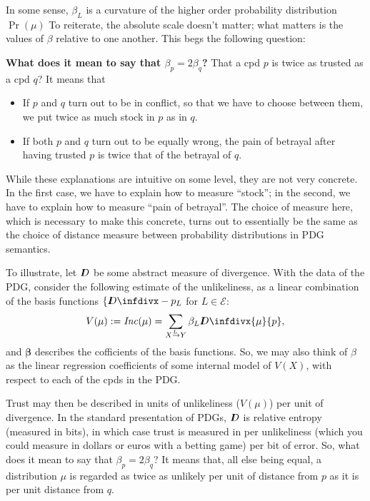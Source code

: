 \documentclass[twoside]{article} %
\theoremstyle{plain}
\theoremstyle{definition}
\newcommand{\thickD}{I\mkern-8muD}
\newcommand{\kldiv}{\thickD\infdivx}
\newcommand{\Ed}{\mathcal E}
\newcommand{\bbeta}{\boldsymbol\beta}
\newcommand\Inc{\mathit{Inc}}
\newcommand{\ed}[3]{#2%
    	  \overset{\smash{\mskip-5mu\raisebox{-1pt}{$\scriptscriptstyle
    	        #1$}}}{\rightarrow} #3}
\begin{document}
    In some sense, $\beta_L$ is a curvature of the higher order probability distribution $\Pr(\mu)$
    To reiterate, the absolute scale doesn't matter; what matters is the values of $\beta$ relative to one another. This begs the following question:



    \textbf{What does it mean to say that $\beta_p = 2 \beta_{q}$?}
    That a cpd $p$ is twice as trusted as a cpd $q$?
    It means that

    \begin{itemize}
        \item If $p$ and $q$ turn out to be in conflict, so that we have to choose between them, we put twice as much stock in $p$ as in $q$.
        \item If both $p$ and $q$ turn out to be equally wrong, the pain of betrayal after having trusted $p$ is twice that of the betrayal of $q$.
    \end{itemize}

    While these explanations are intuitive on some level, they are not very concrete.
    In the first case, we have to explain how to measure ``stock''; in the second, we have to explain how to measure ``pain of betrayal''.  The choice of measure here, which is necessary to make this concrete, turns out to essentially be the same as the choice of distance measure between probability distributions in PDG semantics.

    To illustrate, let $\thickD$ be some abstract measure of divergence.
    With the data of the PDG, consider the following estimate of the unlikeliness, as a linear combination of the basis functions $\{ \kldiv-{p_L}$ for $L \in \Ed$:
    \[
        V(\mu) := \Inc(\mu) = \sum_{\ed LXY} \beta_L \kldiv{\mu}{p},
    \]
    and $\bbeta$ describes the cofficients of the basis functions.
    So, we may also think of $\beta$ as the linear regression coefficients of some internal model of $V(X)$, with respect to each of the cpds in the PDG.

    Trust may then be described in units of unlikeliness ($V(\mu)$) per unit of divergence.  In the standard presentation of PDGs, $\thickD$ is relative entropy (measured in bits), in which case trust is measured in per unlikeliness (which you could measure in dollars or euros with a betting game) per bit of error.
    So, what does it mean to say that $\beta_p = 2 \beta_{q}$?
    It means that, all else being equal, a distribution $\mu$ is regarded as twice as unlikely per unit of distance from $p$ as it is per unit distance from $q$.
\end{document}

